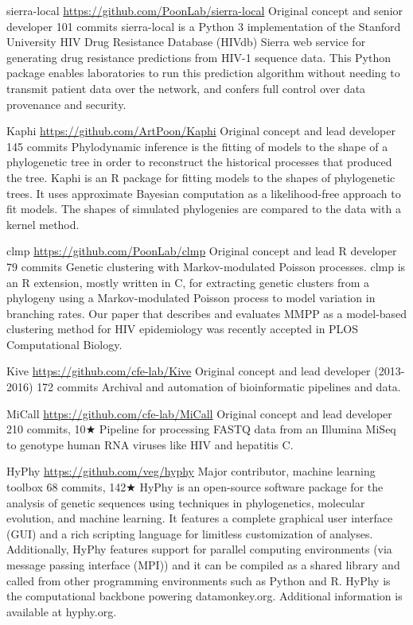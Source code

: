 {sierra-local}
{\url{https://github.com/PoonLab/sierra-local}}
{Original concept and senior developer}
{101 commits}
{sierra-local is a Python 3 implementation of the Stanford University HIV Drug Resistance Database (HIVdb) Sierra web service for generating drug resistance predictions from HIV-1 sequence data. This Python package enables laboratories to run this prediction algorithm without needing to transmit patient data over the network, and confers full control over data provenance and security.}


{Kaphi}
{\url{https://github.com/ArtPoon/Kaphi}}
{Original concept and lead developer}
{145 commits}
{Phylodynamic inference is the fitting of models to the shape of a phylogenetic tree in order to reconstruct the historical processes that produced the tree.
Kaphi is an R package for fitting models to the shapes of phylogenetic trees.
It uses approximate Bayesian computation as a likelihood-free approach to fit models.
The shapes of simulated phylogenies are compared to the data with a kernel method.}



{clmp}
{\url{https://github.com/PoonLab/clmp}}
{Original concept and lead R developer}
{79 commits}
{Genetic clustering with Markov-modulated Poisson processes. 
clmp is an R extension, mostly written in C, for extracting genetic clusters from a phylogeny using a Markov-modulated Poisson process to model variation in branching rates. Our paper that describes and evaluates MMPP as a model-based clustering method for HIV epidemiology was recently accepted in PLOS Computational Biology.
}


{Kive}
{\url{https://github.com/cfe-lab/Kive}}
{Original concept and lead developer (2013-2016)}
{172 commits}
{Archival and automation of bioinformatic pipelines and data.}


{MiCall}
{\url{https://github.com/cfe-lab/MiCall}}
{Original concept and lead developer}
{210 commits, 10$\bigstar$}
{Pipeline for processing FASTQ data from an Illumina MiSeq to genotype human RNA viruses like HIV and hepatitis C.}


{HyPhy}
{\url{https://github.com/veg/hyphy}}
{Major contributor, machine learning toolbox}
{68 commits, 142$\bigstar$}
{HyPhy is an open-source software package for the analysis of genetic sequences using techniques in phylogenetics, molecular evolution, and machine learning. It features a complete graphical user interface (GUI) and a rich scripting language for limitless customization of analyses. Additionally, HyPhy features support for parallel computing environments (via message passing interface (MPI)) and it can be compiled as a shared library and called from other programming environments such as Python and R. HyPhy is the computational backbone powering datamonkey.org. Additional information is available at hyphy.org.}



